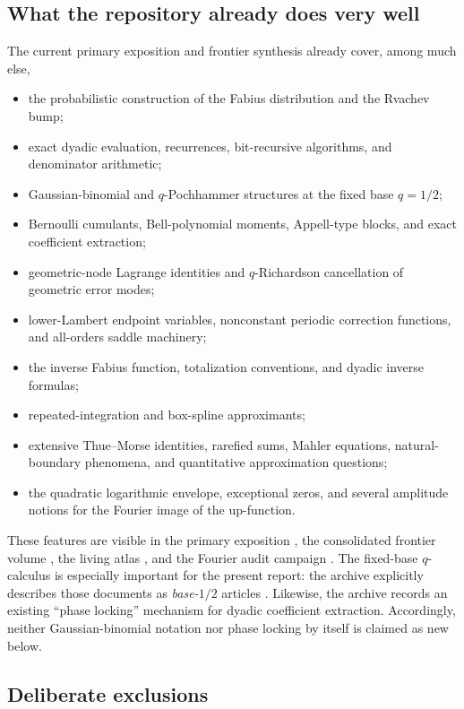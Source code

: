 \documentclass[11pt]{article}
\numberwithin{equation}{section}
\theoremstyle{definition}
\theoremstyle{remark}
\begin{document}
\subsection{What the repository already does very well}

The current primary exposition and frontier synthesis already cover, among much else,
\begin{itemize}
\item the probabilistic construction of the Fabius distribution and the Rvachev bump;
\item exact dyadic evaluation, recurrences, bit-recursive algorithms, and denominator
      arithmetic;
\item Gaussian-binomial and $q$-Pochhammer structures at the fixed base $q=1/2$;
\item Bernoulli cumulants, Bell-polynomial moments, Appell-type blocks, and exact coefficient
      extraction;
\item geometric-node Lagrange identities and $q$-Richardson cancellation of geometric error
      modes;
\item lower-Lambert endpoint variables, nonconstant periodic correction functions, and
      all-orders saddle machinery;
\item the inverse Fabius function, totalization conventions, and dyadic inverse formulas;
\item repeated-integration and box-spline approximants;
\item extensive Thue--Morse identities, rarefied sums, Mahler equations, natural-boundary
      phenomena, and quantitative approximation questions;
\item the quadratic logarithmic envelope, exceptional zeros, and several amplitude notions
      for the Fourier image of the up-function.
\end{itemize}
These features are visible in the primary exposition \cite{p10:proveitPrimary}, the consolidated
frontier volume \cite{p10:proveitFrontiers}, the living atlas \cite{p10:proveitAtlas}, and the
Fourier audit campaign \cite{p10:proveitFourierAudit}.  The fixed-base $q$-calculus is especially
important for the present report: the archive explicitly describes those documents as
\emph{base-$1/2$} articles \cite{p10:proveitArchive}.  Likewise, the archive records an existing
``phase locking'' mechanism for dyadic coefficient extraction.  Accordingly, neither
Gaussian-binomial notation nor phase locking by itself is claimed as new below.

\subsection{Deliberate exclusions}
\end{document}
